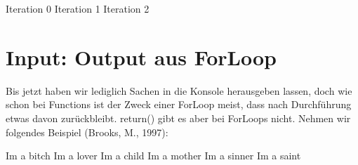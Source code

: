 \documentclass[letterpaper,10pt,english]{sphinxmanual}
\begin{document}
\begin{sphinxVerbatim}[commandchars=\\\{\}]
   
\end{sphinxVerbatim}

\begin{sphinxVerbatim}[commandchars=\\\{\}]
Iteration 0
Iteration 1
Iteration 2
\end{sphinxVerbatim}


\section{Input: Output aus For\sphinxhyphen{}Loop}
\label{\detokenize{03_02_For_Loops:input-output-aus-for-loop}}
Bis jetzt haben wir lediglich Sachen in die Konsole herausgeben lassen, doch wie schon bei Functions ist der Zweck einer For\sphinxhyphen{}Loop meist, dass nach Durchführung etwas davon zurückbleibt. return() gibt es aber bei For\sphinxhyphen{}Loops nicht. Nehmen wir folgendes Beispiel (Brooks, M., 1997):

\begin{sphinxVerbatim}[commandchars=\\\{\}]
   \PYG{p}{[}\PYG{p}{]}
        
\end{sphinxVerbatim}

\begin{sphinxVerbatim}[commandchars=\\\{\}]
I\PYGZsq{}m a bitch
I\PYGZsq{}m a lover
I\PYGZsq{}m a child
I\PYGZsq{}m a mother
I\PYGZsq{}m a sinner
I\PYGZsq{}m a saint
\end{sphinxVerbatim}
\end{document}

